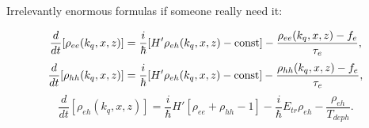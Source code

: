 Irrelevantly enormous
formulas if someone really need it:

\begin{equation*}
	\frac{d}{d t}[\rho_{ee}(k_q, x, z)] = \frac{i}{\hbar}[H' \rho_{eh}(k_q, x, z) - \text{const}] - \frac{\rho_{ee}(k_q, x, z) - f_e}{\tau_e},
\end{equation*}
\begin{equation*}
	\frac{d}{d t}[\rho_{hh}(k_q, x, z)] = \frac{i}{\hbar}[H' \rho_{eh}(k_q, x, z) - \text{const}] - \frac{\rho_{hh}(k_q, x, z) - f_e}{\tau_e},
\end{equation*}
\begin{equation*}
	\frac{d}{d t}[\rho_{eh}(k_q, x, z)] = \frac{i}{\hbar} H'[\rho_{ee} + \rho_{hh} - 1] - \frac{i}{\hbar} E_{tr} \rho_{e h} - \frac{\rho_{eh}}{T_{deph}}.
\end{equation*}